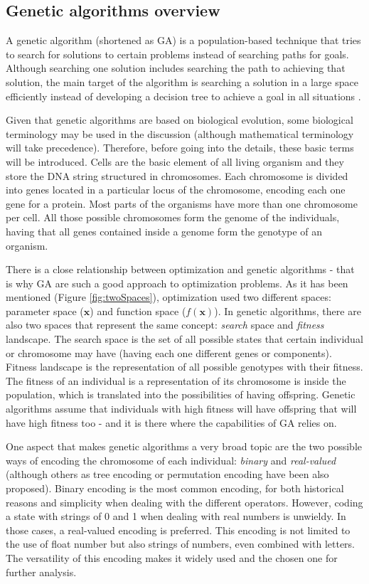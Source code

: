 \subsection{Genetic algorithms overview}
    
    A genetic algorithm (shortened as GA) is a population-based technique that tries to search for solutions to certain problems instead of searching paths for goals. Although searching one solution includes searching the path to achieving that solution, the main target of the algorithm is searching a solution in a large space efficiently instead of developing a decision tree to achieve a goal in all situations \cite{mitchell1998introduction}.
    
    Given that genetic algorithms are based on biological evolution, some biological terminology may be used in the discussion (although mathematical terminology will take precedence). Therefore, before going into the details, these basic terms will be introduced. Cells are the basic element of all living organism and they store the DNA string structured in chromosomes. Each chromosome is divided into genes located in a particular locus of the chromosome, encoding each one gene for a protein. Most parts of the organisms have more than one chromosome per cell. All those possible chromosomes form the genome of the individuals, having that all genes contained inside a genome form the genotype of an organism. 

    There is a close relationship between optimization and genetic algorithms - that is why GA are such a good approach to optimization problems. As it has been mentioned (Figure \ref{fig:twoSpaces}), optimization used two different spaces: parameter space ($\bm{x}$) and function space ($f(\bm{x})$). In genetic algorithms, there are also two spaces that represent the same concept: \textit{search} space and \textit{fitness} landscape. The search space is the set of all possible states that certain individual or chromosome may have (having each one different genes or components). Fitness landscape is the representation of all possible genotypes with their fitness. The fitness of an individual is a representation of  its chromosome is inside the population, which is translated into the possibilities of having offspring. Genetic algorithms assume that individuals with high fitness will have offspring that will have high fitness too - and it is there where the capabilities of GA relies on.
    
    One aspect that makes genetic algorithms a very broad topic are the two possible ways of encoding the chromosome of each individual: \textit{binary} and \textit{real-valued} (although others as tree encoding or permutation encoding \cite{ronald1995genetic} have been also proposed). Binary encoding is the most common encoding, for both historical reasons and simplicity when dealing with the different operators. However, coding a state with strings of 0 and 1 when dealing with real numbers is unwieldy. In those cases, a real-valued encoding is preferred. This encoding is not limited to the use of float number but also strings of numbers, even combined with letters. The versatility of this encoding makes it widely used and the chosen one for further analysis. 
    
